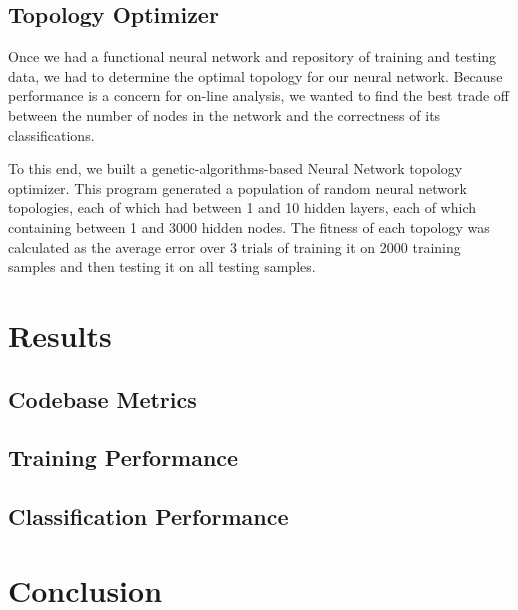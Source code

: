 \documentclass{report}
\begin{document}
\section{Topology Optimizer}


Once we had a functional neural network and repository of training and testing data, we had to determine the optimal topology for our neural network. Because performance is a concern for on-line analysis, we wanted to find the best trade off between the number of nodes in the network and the correctness of its classifications.

To this end, we built a genetic-algorithms-based Neural Network topology optimizer. This program generated a population of random neural network topologies, each of which had between 1 and 10 hidden layers, each of which containing between 1 and 3000 hidden nodes. The fitness of each topology was calculated as the average error over 3 trials of training it on 2000 training samples and then testing it on all testing samples.

\chapter{Results}

\section{Codebase Metrics}


\section{Training Performance}


\section{Classification Performance}


\chapter{Conclusion}


\printbibliography
\end{document}
